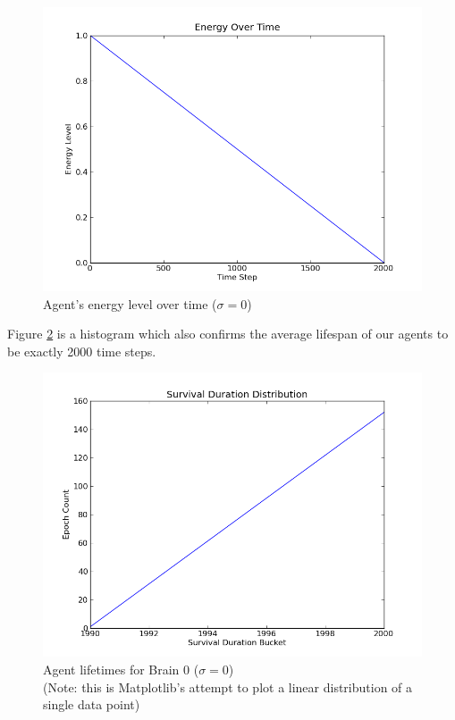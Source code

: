 \begin{figure}
\begin{center}
  \includegraphics[scale=.65]{plots/brain0energy.png}
  \caption{Agent's energy level over time ($\sigma = 0$)}
  \label{fig:brain0energy}
\end{center}
\end{figure}

Figure \ref{fig:brain0his} is a histogram which also confirms the average 
lifespan of our agents to be exactly 2000 time steps.

\begin{figure}
\begin{center}
  \includegraphics[scale=.65]{plots/brain0hist.png}
  \caption{Agent lifetimes for Brain 0 ($\sigma = 0$)\\
  (Note: this is Matplotlib's attempt to plot a linear distribution of
  a single data point)}
  \label{fig:brain0his}
\end{center}
\end{figure}


